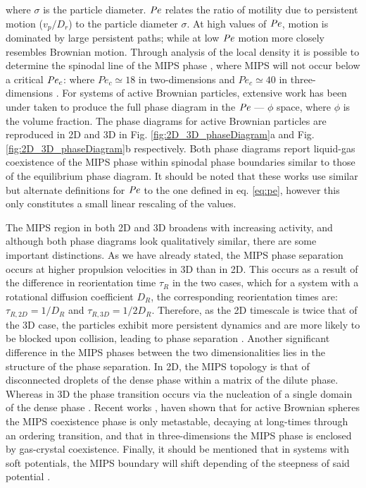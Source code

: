  \noindent where $\sigma$ is the particle diameter. $\operatorname{\mathit{P\kern-.08em e}}$ relates the ratio of motility due to persistent motion ($v_p/D_r$) to the particle diameter $\sigma$. At high values of $\operatorname{\mathit{P\kern-.08em e}}$, motion is dominated by large persistent paths; while at low $\operatorname{\mathit{P\kern-.08em e}}$ motion more closely resembles Brownian motion. 
 Through analysis of the local density it is possible to determine the spinodal line of the MIPS phase \cite{digregorio2018,omar2021a}, where MIPS will not occur below a critical $\operatorname{\mathit{P\kern-.08em e}}_c$: where $Pe_c \simeq  18$ in two-dimensions and   $Pe_c \simeq  40$ in three-dimensions \cite{turci2021,digregorio2018,omar2021a}.  For systems of active Brownian particles, extensive work has been under taken to produce the full phase diagram in the $\operatorname{\mathit{P\kern-.08em e}}$ --- $\phi$ space, where $\phi $ is the volume fraction. The phase diagrams for active Brownian particles are reproduced in 2D and 3D in Fig. \ref{fig:2D_3D_phaseDiagram}a and Fig. \ref{fig:2D_3D_phaseDiagram}b respectively.
Both phase diagrams report liquid-gas coexistence of the MIPS phase within spinodal phase boundaries similar to those of the equilibrium phase diagram. It should be noted that these works use similar but alternate definitions for $\operatorname{\mathit{P\kern-.08em e}}$ to the one defined in eq. \ref{eq:pe}, however this only constitutes a small linear rescaling of the values. 
 
The MIPS region in both 2D and 3D broadens with increasing activity, and although both phase diagrams look qualitatively similar, there are some important distinctions. As we have already stated, the MIPS phase separation occurs at higher propulsion velocities in 3D than in 2D. This occurs as a result of the difference in reorientation time $\tau_R$ in the two cases, which for a system with a rotational diffusion coefficient $D_R$, the corresponding reorientation times are: $\tau_{R,2D} = 1/D_R$ and $\tau_{R,3D} = 1/2D_R$. Therefore, as the 2D timescale is twice that of the 3D case, the particles exhibit more persistent dynamics and are more likely to be blocked upon collision, leading to phase separation \cite{siebert2017}. Another significant difference in the MIPS phases between the two dimensionalities lies in the structure of the phase separation. In 2D, the MIPS topology is that of disconnected droplets of the dense phase within a matrix of the dilute phase. Whereas in 3D the phase transition occurs via the nucleation of a single domain of the dense phase \cite{stenhammar2014}.
Recent works \cite{omar2021a,turci2021}, haven shown that for active Brownian spheres the MIPS coexistence phase is only metastable, decaying at long-times through an ordering transition, and that in three-dimensions the MIPS phase is enclosed by gas-crystal coexistence. Finally, it should be mentioned that in systems with soft potentials, the MIPS boundary will shift depending of the steepness of said potential \cite{martin-roca2021}.

